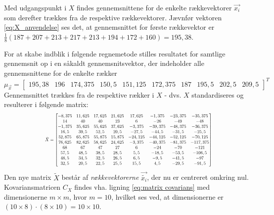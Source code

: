 Med udgangspunkt i $X$ findes gennemsnittene for de enkelte rækkevektorer $\vec{x_i}$ som derefter trækkes fra de respektive rækkevektorer. Jævnfør vektoren \vref{eq:X_anvendelse} ses det, at gennemsnittet for første rækkevektor er $\frac{1}{8} (187 + 207 + 213 + 217 + 213 + 194 + 172 + 160) = 195,38$.

For at skabe indblik i følgende regnemetode stilles resultatet for samtlige gennemsnit op i en såkaldt gennemsnitsvektor, der indeholder alle gennemsnittene for de enkelte rækker
\begin{equation}
\mu_{\vec{x}} = \begin{bmatrix}
195,38 & 196 & 174,375 & 150,5 & 151,125 & 172,375 & 187 & 195,5 & 202,5 & 209,5 
\end{bmatrix}^T
\label{eq:X_anvendelse}
\end{equation}
Gennemsnittet trækkes fra de respektive rækker i $X$ - dvs. $X$ standardiseres og resulterer i følgende matrix:
\begin{equation}\resizebox{.7\textwidth}{!}{$
\tilde{X}=\begin{bmatrix}
-8,375 & 11,625 & 17,625 & 21,625 & 17,625 & -1,375 & -23,375 & -35,375 \\
14 & 40 & 40 & 23 & 6 & -26 & -49 & -48 \\
-1,375 & 35,625 & 55,625 & 37,625 & -3,375 & -39,375 & -48,375 & -36,375 \\
16,5 & 39,5 & 52,5 & 20,5 & -27,5 & -44,5 & -31,5 & -25,5 \\
52,875 & 65,875 & 55,875 & 15,875 & -24,125 & -44,125 & -52,125 & -70,125 \\
76,625 & 82,625 & 58,625 & 24,625 & -3,375 & -40,375 & -81,375 & -117,375 \\
68 & 67 & 47 & 27 & 6 & -24 & -70 & -121 \\
57,5 & 48,5 & 38,5 & 28,5 & 5,5 & -18,5 & -53,5 & -106,5 \\
48,5 & 34,5 & 32,5 & 26,5 & 6,5 & -9,5 & -41,5 & -97 \\
32,5 & 20,5 & 22,5 & 25,5 & 15,5 & 4,5 & -29,5 & -91,5 \\
\end{bmatrix}$}
\label{eq:X_tilde}
\end{equation}
Den nye matrix $\tilde{X}$ består af \emph{rækkevektorerne} $\vec{\tilde{x_i}}$, der nu er centreret omkring nul. Kovariansmatricen $C_{X}$ findes vha. ligning \ref{eq:matrix covarians} med dimensionerne $m \times m$, hvor $m = 10$, hvilket ses ved, at dimensionerne er $(10 \times 8) \cdot (8 \times 10) = 10 \times 10$.
